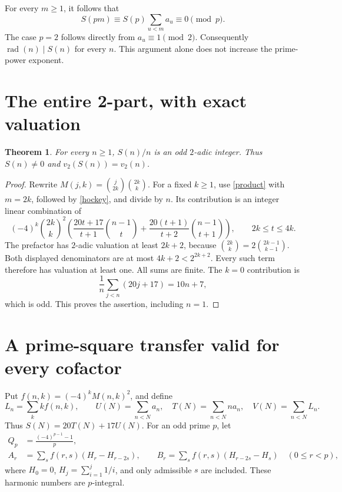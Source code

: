 \documentclass[11pt,a4paper]{article}
\newtheorem{theorem}{Theorem}[section]
\theoremstyle{remark}\newtheorem{remark}[theorem]{Remark}
\newcommand{\rad}{\operatorname{rad}}
\begin{document}
For every \(m\ge1\), it follows that
\begin{equation}\label{primeprop}
 S(pm)\equiv S(p)\sum_{u<m}a_u\equiv0\pmod p.
\end{equation}
The case \(p=2\) follows directly from \(a_u\equiv1\pmod2\).
Consequently \(\rad(n)\mid S(n)\) for every \(n\).
This argument alone does not increase the prime-power exponent.

\section{The entire 2-part, with exact valuation}

\begin{theorem}\label{twoadic}
For every \(n\ge1\), \(S(n)/n\) is an odd \(2\)-adic integer.
Thus \(S(n)\ne0\) and \(v_2(S(n))=v_2(n)\).
\end{theorem}
\begin{proof}
Rewrite \(M(j,k)=\binom j{2k}\binom{2k}k\).
For a fixed \(k\ge1\), use \eqref{product} with \(m=2k\), followed
by \eqref{hockey}, and divide by \(n\). Its contribution is an integer
linear combination of
\[
 (-4)^k\binom{2k}k^2
 \left(
 \frac{20t+17}{t+1}\binom{n-1}t+
 \frac{20(t+1)}{t+2}\binom{n-1}{t+1}
 \right),\qquad 2k\le t\le4k.
\]
The prefactor has \(2\)-adic valuation at least \(2k+2\), because
\(\binom{2k}k=2\binom{2k-1}{k-1}\).
Both displayed denominators are at most \(4k+2<2^{2k+2}\).
Every such term therefore has valuation at least one.
All sums are finite. The \(k=0\) contribution is
\[
                  \frac1n\sum_{j<n}(20j+17)=10n+7,
\]
which is odd. This proves the assertion, including \(n=1\).
\end{proof}

\section{A prime-square transfer valid for every cofactor}\label{sec:transfer}

Put \(f(n,k)=(-4)^kM(n,k)^2\), and define
\[
 L_n=\sum_k kf(n,k),\qquad
 U(N)=\sum_{n<N}a_n,\quad T(N)=\sum_{n<N}n a_n,\quad
 V(N)=\sum_{n<N}L_n.
\]
Thus \(S(N)=20T(N)+17U(N)\).
For an odd prime \(p\), let
\[
 \begin{aligned}
 Q_p&=\frac{(-4)^{p-1}-1}{p},\\
 A_r&=\sum_s f(r,s)(H_r-H_{r-2s}),\qquad
 B_r=\sum_s f(r,s)(H_{r-2s}-H_s)\quad(0\le r<p),
 \end{aligned}
\]
where \(H_0=0\), \(H_j=\sum_{i=1}^j1/i\), and only admissible \(s\)
are included. These harmonic numbers are \(p\)-integral.
\end{document}
